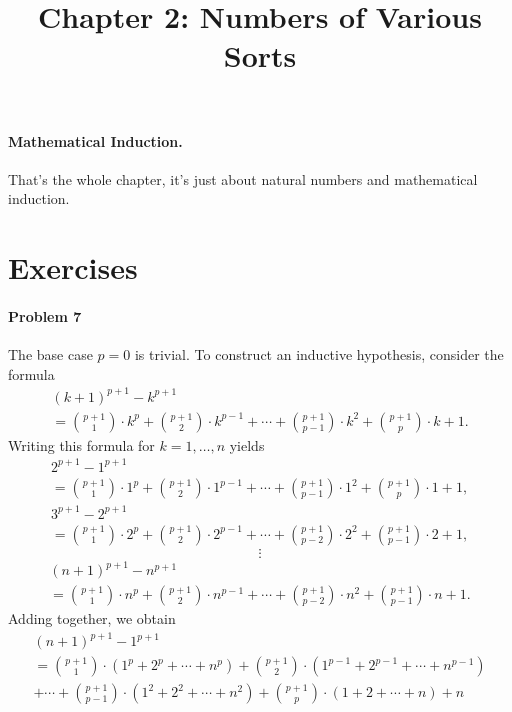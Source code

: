 \documentclass{article}
\begin{document}
\title{Chapter 2: Numbers of Various Sorts}
\maketitle

\paragraph{Mathematical Induction.} That's the whole chapter, it's just about
natural numbers and mathematical induction.

\section*{Exercises}

\paragraph{Problem 7} The base case $p = 0$ is trivial. To construct an
inductive hypothesis, consider the formula
\begin{multline*}
  (k + 1)^{p+1} - k^{p+1} \\
  = \binom{p+1}{1} \cdot k^p + \binom{p+1}{2} \cdot k^{p-1} + \cdots +
  \binom{p+1}{p-1} \cdot k^2 + \binom{p+1}{p} \cdot k + 1.
\end{multline*}
Writing this formula for $k = 1, \ldots, n$ yields
\begin{multline*}
  2^{p+1} - 1^{p+1} \\
  = \binom{p+1}{1} \cdot 1^p + \binom{p+1}{2} \cdot 1^{p-1} + \cdots +
  \binom{p+1}{p-1} \cdot 1^2 + \binom{p+1}{p} \cdot 1 + 1,
\end{multline*}
\begin{multline*}
  3^{p+1} - 2^{p+1} \\
  = \binom{p+1}{1} \cdot 2^p + \binom{p+1}{2} \cdot 2^{p-1} + \cdots +
  \binom{p+1}{p-2} \cdot 2^2 + \binom{p+1}{p-1} \cdot 2 + 1,
\end{multline*}
\[
  \vdots
\]
\begin{multline*}
  (n + 1)^{p+1} - n^{p+1} \\
  = \binom{p+1}{1} \cdot n^p + \binom{p+1}{2} \cdot n^{p-1} + \cdots +
  \binom{p+1}{p-2} \cdot n^2 + \binom{p+1}{p-1} \cdot n + 1.
\end{multline*}
Adding together, we obtain
\begin{multline*}
  (n + 1)^{p+1} - 1^{p+1} \\
  = \binom{p+1}{1} \cdot (1^p + 2^p + \cdots + n^p) + \binom{p+1}{2} \cdot
  (1^{p-1} + 2^{p-1} + \cdots + n^{p-1}) \\ + \cdots + \binom{p+1}{p-1} \cdot
  (1^2 + 2^2 + \cdots + n^2) + \binom{p+1}{p} \cdot (1 + 2 + \cdots + n) + n
\end{multline*}
\end{document}
